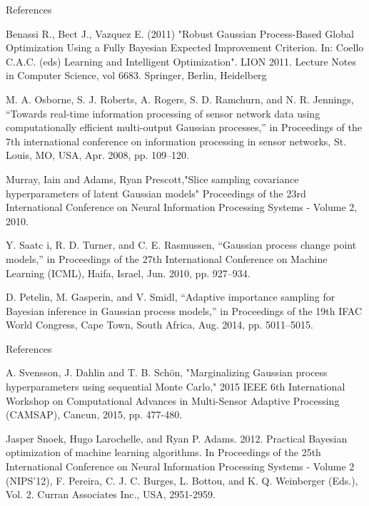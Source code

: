 \documentclass{beamer}
\begin{document}
\begin{frame}{References}
\begin{itemize}
	
	{\scriptsize
	\item Benassi R., Bect J., Vazquez E. (2011) "Robust Gaussian Process-Based Global Optimization Using a Fully Bayesian Expected Improvement Criterion. In: Coello C.A.C. (eds) Learning and Intelligent Optimization". LION 2011. Lecture Notes in Computer Science, vol 6683. Springer, Berlin, Heidelberg
	
	\item M. A. Osborne, S. J. Roberts, A. Rogers, S. D. Ramchurn, and N. R.
	Jennings, “Towards real-time information processing of sensor network
	data using computationally efficient multi-output Gaussian processes,”
	in Proceedings of the 7th international conference on information
	processing in sensor networks, St. Louis, MO, USA, Apr. 2008, pp.
	109–120.
	
	\item Murray, Iain and Adams, Ryan Prescott,"Slice sampling covariance hyperparameters of latent Gaussian models" Proceedings of the 23rd International Conference on Neural Information Processing Systems - Volume 2, 2010.
	
	\item Y. Saatc i, R. D. Turner, and C. E. Rasmussen, “Gaussian process change
	point models,” in Proceedings of the 27th International Conference on
	Machine Learning (ICML), Haifa, Israel, Jun. 2010, pp. 927–934.
	
	\item  D. Petelin, M. Gasperin, and V.  Smidl, “Adaptive importance sampling
	for Bayesian inference in Gaussian process models,” in Proceedings of
	the 19th IFAC World Congress, Cape Town, South Africa, Aug. 2014,
	pp. 5011–5015.
}
	
\end{itemize}
\end{frame}

\begin{frame}{References}
\begin{itemize}
	
	{\scriptsize
		\item A. Svensson, J. Dahlin and T. B. Schön, "Marginalizing Gaussian process hyperparameters using sequential Monte Carlo," 2015 IEEE 6th International Workshop on Computational Advances in Multi-Sensor Adaptive Processing (CAMSAP), Cancun, 2015, pp. 477-480.
		
		\item Jasper Snoek, Hugo Larochelle, and Ryan P. Adams. 2012. Practical Bayesian optimization of machine learning algorithms. In Proceedings of the 25th International Conference on Neural Information Processing Systems - Volume 2 (NIPS'12), F. Pereira, C. J. C. Burges, L. Bottou, and K. Q. Weinberger (Eds.), Vol. 2. Curran Associates Inc., USA, 2951-2959.
		
		
	}
	
\end{itemize}
\end{frame}
\end{document}
